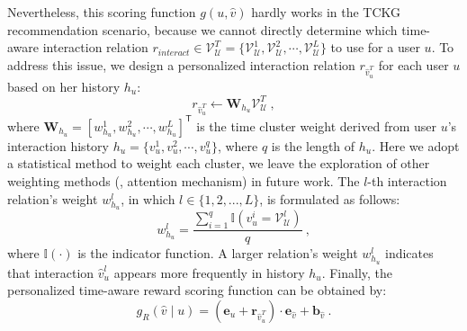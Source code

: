 Nevertheless, this scoring function $g(u, \hat{v})$ hardly works in the TCKG recommendation scenario, because we cannot directly determine which time-aware interaction relation $ r_{interact} \in \mathcal{V}_{\mathcal{U}}^T = \{  \mathcal{V}_{\mathcal{U}}^1, \mathcal{V}_{\mathcal{U}}^2, \cdots, \mathcal{V}_{\mathcal{U}}^{L} \}$ to use for a user $u$.
To address this issue, we design a personalized interaction relation $r_{\hat{v}_u^T}$ for each user $u$ based on her history $h_u$:
\begin{equation}\label{perre}
    r_{\hat{v}_u^T} \leftarrow \boldsymbol{W}_{h_u}\mathcal{V}_\mathcal{U}^T \ ,
\end{equation}
where $\boldsymbol{W}_{h_u} = [w_{h_u}^1, w_{h_u}^2, \cdots, w_{h_u}^L]^{\mathsf{T}}$ is the time cluster weight derived from user $u$'s interaction history $h_u = \{v_u^1, v_u^2, \cdots, v_u^q\}$, where $q$ is the length of $h_u$. 
Here we adopt a statistical method to weight each cluster, we leave the exploration of other weighting methods (\eg, attention mechanism) in future work.
The $l$-th interaction relation's weight $w_{h_u}^l$, in which $l \in \{1,2,...,L\}$, is formulated as follows:
\begin{equation}
w_{h_u}^l = \dfrac{\sum_{i=1}^q{\mathbb{I}(v_u^i = \mathcal{V}_\mathcal{U}^l)}}{q} \ ,
\end{equation}
where $\mathbb{I}(\cdot)$ is the indicator function. A larger relation's weight $w_{h_u}^l$ indicates that interaction $\hat{v}_u^l$ appears more frequently in history $h_u$.
Finally, the personalized time-aware reward
scoring function can be obtained by:
\begin{equation}\label{reward}
g_R(\hat{v} \mid u) = (\boldsymbol{e}_u + \boldsymbol{r}_{\hat{v}_u^T}) \cdot \boldsymbol{e}_{\hat{v}} + \boldsymbol{b}_{\hat{v}} \ .
\end{equation}




